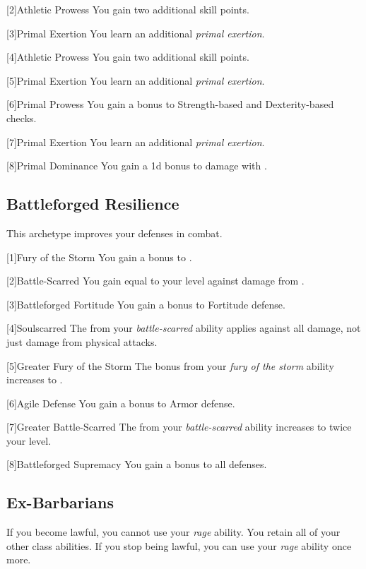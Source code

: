         [2]{Athletic Prowess} You gain two additional skill points.

        [3]{Primal Exertion}
        You learn an additional \textit{primal exertion}.

        [4]{Athletic Prowess} You gain two additional skill points.

        [5]{Primal Exertion}
        You learn an additional \textit{primal exertion}.

        [6]{Primal Prowess}
        You gain a  bonus to Strength-based and Dexterity-based checks.

        [7]{Primal Exertion}
        You learn an additional \textit{primal exertion}.

        [8]{Primal Dominance}
        You gain a \plus1d bonus to damage with .

    \subsection{Battleforged Resilience}
        This archetype improves your defenses in combat.

        [1]{Fury of the Storm} You gain a  bonus to .

        [2]{Battle-Scarred} You gain  equal to your level against damage from .

        [3]{Battleforged Fortitude} You gain a  bonus to Fortitude defense.

        [4]{Soulscarred} The  from your \textit{battle-scarred} ability applies against all damage, not just damage from physical attacks.

        [5]{Greater Fury of the Storm}
        The bonus from your \textit{fury of the storm} ability increases to .

        [6]{Agile Defense}
        You gain a  bonus to Armor defense.

        [7]{Greater Battle-Scarred}
        The  from your \textit{battle-scarred} ability increases to twice your level.

        [8]{Battleforged Supremacy}
        You gain a  bonus to all defenses.

    \subsection{Ex-Barbarians}
        If you become lawful, you cannot use your \textit{rage} ability.
        You retain all of your other class abilities.
        If you stop being lawful, you can use your \textit{rage} ability once more.

